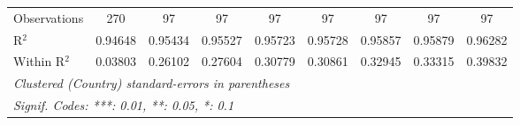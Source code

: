 \begin{table}[htbp]
\begin{tabular}{lcccccccc}
      Observations                            & 270             & 97             & 97          & 97          & 97       & 97           & 97            & 97\\  
      R$^2$                                   & 0.94648         & 0.95434        & 0.95527     & 0.95723     & 0.95728  & 0.95857      & 0.95879       & 0.96282\\  
      Within R$^2$                            & 0.03803         & 0.26102        & 0.27604     & 0.30779     & 0.30861  & 0.32945      & 0.33315       & 0.39832\\  
      \midrule \midrule
      \multicolumn{9}{l}{\emph{Clustered (Country) standard-errors in parentheses}}\\
      \multicolumn{9}{l}{\emph{Signif. Codes: ***: 0.01, **: 0.05, *: 0.1}}\\
   \end{tabular}
\end{table}


